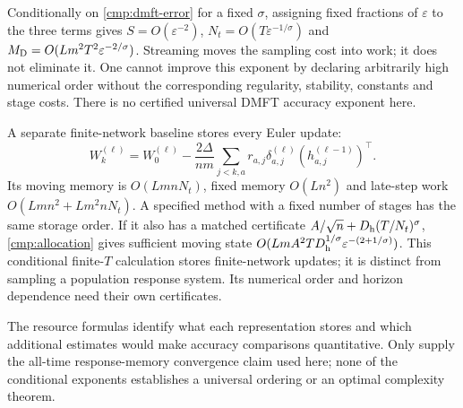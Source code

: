 Conditionally on \eqref{cmp:dmft-error} for a fixed $\sigma$, assigning fixed
fractions of $\varepsilon$ to the three terms gives
$S=O(\varepsilon^{-2})$, $N_t=O(T\varepsilon^{-1/\sigma})$ and
$M_{\rm D}=O(Lm^2T^2\varepsilon^{-2/\sigma})$.
Streaming moves the sampling cost into work; it does not eliminate it.
One cannot improve this exponent by declaring arbitrarily high numerical
order without the corresponding regularity, stability, constants and stage
costs.  There is no certified universal DMFT accuracy exponent here.

A separate finite-network baseline stores every Euler update:
\[
 W^{(\ell)}_k=W^{(\ell)}_0-\frac{2\Delta}{nm}
 \sum_{j<k,a}r_{a,j}\delta^{(\ell)}_{a,j}
                          (h^{(\ell-1)}_{a,j})^\top.
\]
Its moving memory is $O(LmnN_t)$, fixed memory $O(Ln^2)$ and late-step
work $O(Lmn^2+Lm^2nN_t)$.  A specified method with a fixed number of
stages has the same storage order.  If it also has a matched certificate
$A/\sqrt n+D_{\rm h}(T/N_t)^\sigma$, \eqref{cmp:allocation} gives
sufficient moving state
$O(LmA^2T D_{\rm h}^{1/\sigma}\varepsilon^{-(2+1/\sigma)})$.
This conditional finite-$T$ calculation stores finite-network updates;
it is distinct from sampling a population response system.  Its numerical
order and horizon dependence need their own certificates.

The resource formulas identify what each representation stores and which
additional estimates would make accuracy comparisons quantitative.  Only
 supply the all-time response-memory
convergence claim used here; none of the conditional exponents establishes
a universal ordering or an optimal complexity theorem.
